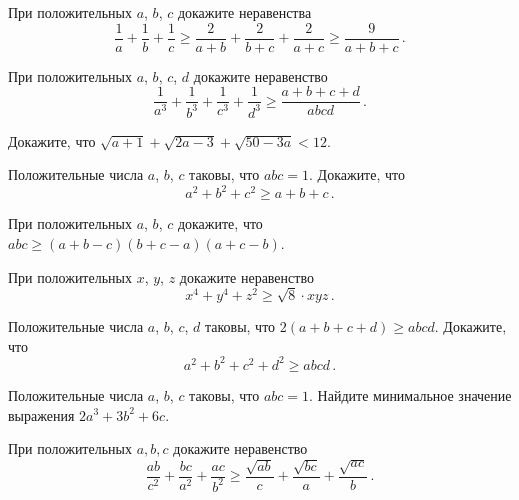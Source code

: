 \begin{problems}

\item 
При положительных $a$, $b$, $c$ докажите неравенства
\[
    \frac{1}{a} + \frac{1}{b} + \frac{1}{c}
\geq
    \frac{2}{a + b} + \frac{2}{b + c} + \frac{2}{a + c}
\geq
    \frac{9}{a + b + c}
\, . \]

\item
При положительных $a$, $b$, $c$, $d$ докажите неравенство
\[
    \frac{1}{a^3} + \frac{1}{b^3} + \frac{1}{c^3} + \frac{1}{d^3}
\geq
    \frac{a + b + c + d}{a b c d}
\, . \]

\item 
Докажите, что
\(
    \sqrt{a + 1} + \sqrt{2 a - 3} + \sqrt{50 - 3 a} < 12
\).

\item
Положительные числа $a$, $b$, $c$ таковы, что $a b c = 1$.
Докажите, что
\[
    a^2 + b^2 + c^2
\geq
    a + b + c
\, . \]

\item 
При положительных $a$, $b$, $c$ докажите, что
\(
    a b c \geq (a + b - c) (b + c - a) (a + c - b)
\).

\item 
При положительных $x$, $y$, $z$ докажите неравенство 
\[
    x^4 + y^4 + z^2 \geq \sqrt{8} \cdot x y z
\, . \]

\item 
Положительные числа $a$, $b$, $c$, $d$ таковы, что $2 (a + b + c + d) \geq a b c d$.
Докажите, что
\[
    a^2 + b^2 + c^2 + d^2
\geq
    a b c d
\, . \]

\item 
Положительные числа $a$, $b$, $c$ таковы, что $a b c = 1$.
Найдите минимальное значение выражения $2 a^3 + 3 b^2 + 6 c$.


\item 
При положительных $a, b, c$ докажите неравенство
\[
    \frac{a b}{c^2} + \frac{b c}{a^2} + \frac{a c}{b^2}
\geq
    \frac{\sqrt{a b}} c + \frac{\sqrt{b c}} a + \frac{\sqrt{a c}} b
\, . \]

\end{problems}

